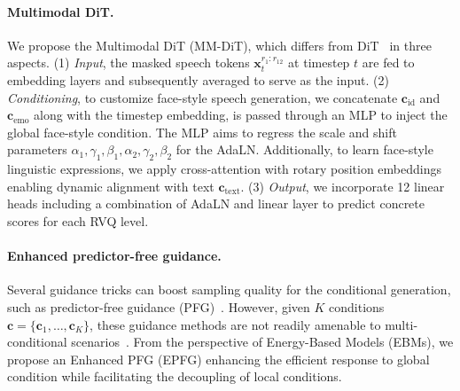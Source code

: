 \paragraph{Multimodal DiT.~~\xspace} 
We propose the Multimodal DiT (MM-DiT), which differs from DiT~\cite{DiT:conf/iccv/PeeblesX23} in three aspects. 
(1) \emph{Input}, the masked speech tokens $\bm{x}^{r_1:r_{12}}_t$ at timestep $t$ are fed to embedding layers and subsequently averaged to serve as the input. 
(2) \emph{Conditioning}, to customize face-style speech generation, we concatenate $\bm{c}_\text{id}$ and $\bm{c}_\text{emo}$ along with the timestep embedding, is passed through an MLP to inject the global face-style condition. The MLP aims to regress the scale and shift parameters $\alpha_1,\gamma_1,\beta_1,\alpha_2,\gamma_2,\beta_2$ for the AdaLN. Additionally, to learn face-style linguistic expressions, we apply cross-attention with rotary position embeddings~\cite{rotary:journals/ijon/SuALPBL24} enabling dynamic alignment with text $\bm{c}_\text{text}$. 
(3) \emph{Output}, we incorporate 12 linear heads including a combination of AdaLN and linear layer to predict concrete scores for each RVQ level. 


\paragraph{Enhanced predictor-free guidance.~~\xspace} 
Several guidance tricks can boost sampling quality for the conditional generation, such as predictor-free guidance (PFG)~\cite{CFG_DDM:journals/corr/abs-2406-01572, CFG/abs-2207-12598}. However, given $K$ conditions $\bm{c} = \{\bm{c}_1,\ldots,\bm{c}_K\}$, these guidance methods are not readily amenable to multi-conditional scenarios~\cite{compositional:conf/eccv/LiuLDTT22}. 
From the perspective of Energy-Based Models (EBMs), we propose an Enhanced PFG (EPFG) enhancing the efficient response to global condition while facilitating the decoupling of local conditions.

